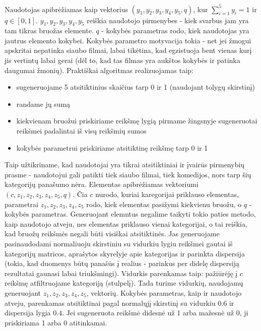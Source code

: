 \documentclass{VUMIFInfMagistrinis}
\begin{document}
\indent
Naudotojas apibrėžiamas kaip vektorius $(y_1, y_2, y_3, y_4, y_5, q)$, kur $\sum\limits_{i=1}^{5} y_i = 1$ ir $q\in[0,1]$. $y_1, y_2, y_3, y_4, y_5$ reiškia naudotojo pirmenybes - kiek svarbus jam yra tam tikras bruožas elemente.
$q$ - kokybės parametras rodo, kiek naudotojas yra jautrus elemento kokybei. Kokybės parametro motyvacija tokia - net jei žmogui apskritai nepatinka siaubo filmai, labai tikėtina, kad egzistuoja bent vienas kurį jis vertintų labai gerai (dėl to, kad tas filmas yra aukštos kokybės ir patinka daugumai žmonių). 
\newline
\indent 
Praktiškai algoritmas realizuojamas taip:
\begin{itemize}
	\item sugeneruojame 5 atsitiktinius skaičius tarp 0 ir 1 (naudojant tolygų skirstinį)
	\item randame jų sumą
	\item kiekvienam bruožui priskiriame reikšmę lygią pirmame žingsnyje sugeneruotai reikšmei padalintai iš visų reikšmių sumos
	\item kokybės parametrui priskiriame atsitiktinę reikšmę tarp 0 ir 1
\end{itemize}
Taip užtikriname, kad naudotojai yra tikrai atsitiktiniai ir įvairūs pirmenybių prasme - naudotojui gali patikti tiek siaubo filmai, tiek komedijos, nors tarp šių kategorijų panašumo nėra.
\indent
Elementas apibrėžiamas vektoriumi $(c, z_1, z_2, z_3, z_4, z_5, q)$. Čia $c$ nurodo, kuriai karegorijai priklauso elementas, parametrai $z_1, z_2, z_3, z_4, z_5$ rodo, kiek elementas pasižymi kiekvienu bruožu, o $q$ - kokybės parametras. Generuojant elemntus negalime taikyti tokio paties metodo, kaip naudotojo atveju, nes elementas priklauso vienai kategorijai, o tai reiškia, kad bruožų reikšmės negali būti visiškai atsitiktinės. Jas generuojame pasinaudodami normaliuoju skirstiniu su vidurkiu lygiu reikšmei gautai iš kategorijų matricos, aprašytos skyrelyje apie kategorijas ir parinkta dispersija (tokia, kad duomenys būtų panašūs į realius - parinkus per didelę dispersiją rezultatai gaunasi labai triukšmingi). Vidurkis parenkamas taip: pažiūrėję į $c$ reikšmę atfiltruojame kategoriją (stulpelį). Tada turime vidurkių, naudojamų generuojant $z_1, z_2, z_3, z_4, z_5$, vektorių. Kokybės parametras, kaip ir naudotojo atveju, parenkamas atsitiktinai pagal normalųjį skirstinį su vidurkiu $0.6$ ir dispersija lygia $0.4$. Jei sugeneruota reikšmė didesnė už 1 arba mažesnė už 0, ji priskiriama 1 arba 0 atitinkamai.
\end{document}
